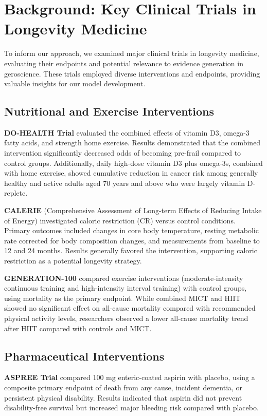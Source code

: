 
\section{Background: Key Clinical Trials in Longevity Medicine}

To inform our approach, we examined major clinical trials in longevity medicine, evaluating their endpoints and potential relevance to evidence generation in geroscience. These trials employed diverse interventions and endpoints, providing valuable insights for our model development.

\subsection{Nutritional and Exercise Interventions}

\textbf{DO-HEALTH Trial} evaluated the combined effects of vitamin D3, omega-3 fatty acids, and strength home exercise. Results demonstrated that the combined intervention significantly decreased odds of becoming pre-frail compared to control groups. Additionally, daily high-dose vitamin D3 plus omega-3s, combined with home exercise, showed cumulative reduction in cancer risk among generally healthy and active adults aged 70 years and above who were largely vitamin D-replete.

\textbf{CALERIE} (Comprehensive Assessment of Long-term Effects of Reducing Intake of Energy) investigated caloric restriction (CR) versus control conditions. Primary outcomes included changes in core body temperature, resting metabolic rate corrected for body composition changes, and measurements from baseline to 12 and 24 months. Results generally favored the intervention, supporting caloric restriction as a potential longevity strategy.

\textbf{GENERATION-100} compared exercise interventions (moderate-intensity continuous training and high-intensity interval training) with control groups, using mortality as the primary endpoint. While combined MICT and HIIT showed no significant effect on all-cause mortality compared with recommended physical activity levels, researchers observed a lower all-cause mortality trend after HIIT compared with controls and MICT.

\subsection{Pharmaceutical Interventions}

\textbf{ASPREE Trial} compared 100 mg enteric-coated aspirin with placebo, using a composite primary endpoint of death from any cause, incident dementia, or persistent physical disability. Results indicated that aspirin did not prevent disability-free survival but increased major bleeding risk compared with placebo.

